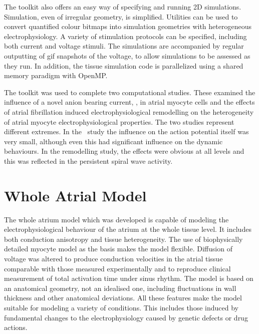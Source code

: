 The toolkit also offers an easy way of specifying and running 2D simulations.
Simulation, even of irregular geometry, is simplified.
Utilities can be used to convert quantified colour bitmaps into simulation
geometries with heterogeneous electrophysiology.
A variety of stimulation protocols can be specified, including both current and
voltage stimuli.
The simulations are accompanied by regular outputting of gif snapshots of the
voltage, to allow simulations to be assessed as they run.
In addition, the tissue simulation code is parallelized using a shared memory
paradigm with OpenMP.

The toolkit was used to complete two computational studies.
These examined the influence of a novel anion bearing current, , in
atrial myocyte cells and the effects of atrial fibrillation induced
electrophysiological remodelling on the heterogeneity of atrial myocyte
electrophysiological properties.
The two studies represent different extremes.
In the \ study the influence on the action potential itself was very
small, although even this had significant influence on the dynamic behaviours.
In the remodelling study, the effects were obvious at all levels and this was
reflected in the persistent spiral wave activity.

\section{Whole Atrial Model}

The whole atrium model which was developed is capable of modeling the
electrophysiological behaviour of the atrium at the whole tissue level.
It includes both conduction anisotropy and tissue heterogeneity.
The use of biophysically detailed myocyte model as the basis makes the model
flexible.
Diffusion of voltage was altered to produce conduction velocities in the atrial
tissue comparable with those measured experimentally and to reproduce clinical
measurement of total activation time under sinus rhythm.
The model is based on an anatomical geometry, not an idealised one, including
fluctuations in wall thickness and other anatomical deviations.
All these features make the model suitable for modeling a variety of conditions.
This includes those induced by fundamental changes to the electrophysiology
caused by genetic defects or drug actions.

